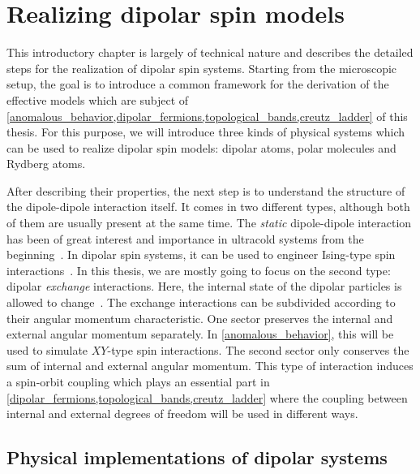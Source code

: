 \chapter{Realizing dipolar spin models}
\label{dipolar_spinmodels}

This introductory chapter is largely of technical nature and describes the detailed steps for
the realization of dipolar spin systems. Starting from the microscopic setup, the goal is to
introduce a common framework for the derivation of the effective models which are subject of
\cref*{anomalous_behavior,dipolar_fermions,topological_bands,creutz_ladder} of this thesis. For this purpose,
we will introduce three kinds of physical systems which can be used to realize dipolar spin
models: dipolar atoms, polar molecules and Rydberg atoms.

After describing their properties, the next step is to understand the structure of the dipole-dipole interaction itself.
It comes in two different types, although both of them are usually present at the same time.
The \emph{static} dipole-dipole interaction has been of great interest and importance in ultracold systems from the beginning~\cite{Goral1999,Santos2000a,Santos2003a,Griesmaier2005a,Stuhler2005,Ronen2007a,Koch2008a,Lahaye2008a,Lahaye2009}.
In dipolar spin systems, it can be used to engineer Ising-type spin interactions~\cite{Micheli2006,Hauke2010,Gorshkov2011,Gorshkov2011b,Peter2012b,Syzranov2014,Peter2014}.
In this thesis, we are mostly going to focus on the second type: dipolar \emph{exchange} interactions.
Here, the internal state of the dipolar particles is allowed to change~\cite{Huber2011,Yan2013,DePaz2013,Hazzard2014,Barredo2014,Syzranov2014}.
The exchange interactions can be subdivided according to their angular momentum characteristic.
One sector preserves the internal and external angular momentum separately.
In \cref{anomalous_behavior}, this will be used to simulate $XY$-type spin interactions.
The second sector only conserves the sum of internal and external angular momentum.
This type of interaction induces a spin-orbit coupling which plays an essential part in \cref{dipolar_fermions,topological_bands,creutz_ladder} where the coupling between internal and external degrees of freedom will be used in different ways.

\section{Physical implementations of dipolar systems}

